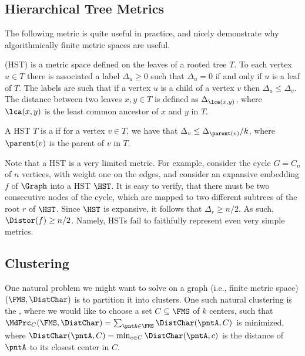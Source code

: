 \subsection{Hierarchical Tree Metrics}

The following metric is quite useful in practice, and nicely
demonstrate why algorithmically finite metric spaces are useful.
\begin{defn}
     (HST) is a metric space
    defined on the leaves of a rooted tree $T$. To each vertex $u\in
    T$ there is associated a label $\Delta_u \ge 0$ such that
    $\Delta_u=0$ if and only if $u$ is a leaf of $T$.  The labels are
    such that if a vertex $u$ is a child of a vertex $v$ then
    $\Delta_u\leq \Delta_v$. The distance between two leaves $x,y\in
    T$ is defined as $\Delta_{\lca(x,y)}$, where $\lca(x,y)$ is the
    least common ancestor of $x$ and $y$ in $T$.
    
    A HST $T$ is a  if for a vertex $v \in T$, we have
    that $\Delta_v \leq \Delta_{\parent(v)}/k$, where $\parent(v)$ is
    the parent of $v$ in $T$.

\end{defn}

Note that a HST is a very limited metric. For example, consider the
cycle $G = C_n$ of $n$ vertices, with weight one on the edges, and
consider an expansive embedding $f$ of $\Graph$ into a HST $\HST$. It is easy
to verify, that there must be two consecutive nodes of the cycle, which
are mapped to two different subtrees of the root $r$ of $\HST$. Since
$\HST$ is expansive, it follows that $\Delta_r \geq n/2$. As such,
$\Distor(f) \geq n/2$. Namely, HSTs fail to faithfully represent even
very simple metrics.

 


\subsection{Clustering}

One natural problem we might want to solve on a graph (i.e., finite
metric space) $(\FMS,\DistChar)$ is to partition it into clusters. One
such natural clustering is the , where we
would like to choose a set $C \subseteq \FMS$ of $k$ centers, such
that
$\MdPrc_C(\FMS,\DistChar) = \sum_{\pntA \in \FMS} \DistChar(\pntA, C)$
is minimized, where
$\DistChar(\pntA,C) = \min_{c \in C} \DistChar(\pntA, c)$ is the
distance of $\pntA$ to its closest center in $C$.

